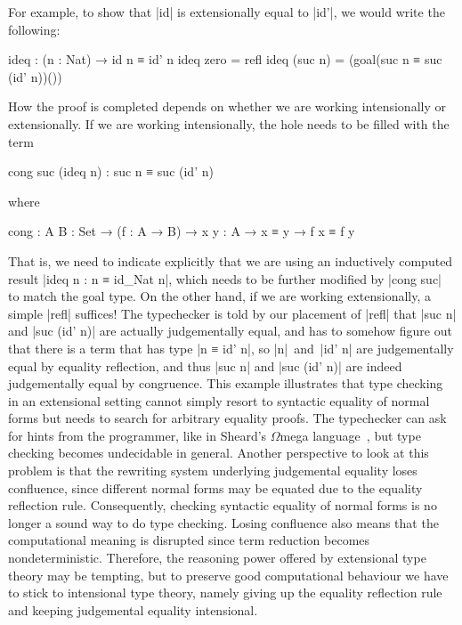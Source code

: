 For example, to show that |id| is extensionally equal to |id'|, we would write the following:
\begin{code}
ideq : (n : Nat) → id n ≡ id' n
ideq zero     = refl
ideq (suc n)  = (goal(suc n ≡ suc (id' n))())
\end{code}
How the proof is completed depends on whether we are working intensionally or extensionally. If we are working intensionally, the hole needs to be filled with the term
\begin{code}
cong suc (ideq n) : suc n ≡ suc (id' n)
\end{code}
where
\begin{code}
cong : {A B : Set} → (f : A → B) → {x y : A} → x ≡ y → f x ≡ f y
\end{code}
That is, we need to indicate explicitly that we are using an inductively computed result |ideq n : n ≡ id_Nat n|, which needs to be further modified by |cong suc| to match the goal type.
On the other hand, if we are working extensionally, a simple |refl| suffices!
The typechecker is told by our placement of |refl| that |suc n| and |suc (id' n)| are actually judgementally equal, and has to somehow figure out that there is a term that has type |n ≡ id' n|, so |n|~and~|id' n| are judgementally equal by equality reflection, and thus |suc n| and |suc (id' n)| are indeed judgementally equal by congruence.
This example illustrates that type checking in an extensional setting cannot simply resort to syntactic equality of normal forms but needs to search for arbitrary equality proofs. The typechecker can ask for hints from the programmer, like in Sheard's {$\Omega$}mega language~\citep{Sheard-Omega}, but type checking becomes undecidable in general.
Another perspective to look at this problem is that the rewriting system underlying judgemental equality loses confluence, since different normal forms may be equated due to the equality reflection rule.
Consequently, checking syntactic equality of normal forms is no longer a sound way to do type checking.
Losing confluence also means that the computational meaning is disrupted since term reduction becomes nondeterministic.
Therefore, the reasoning power offered by extensional type theory may be tempting, but to preserve good computational behaviour we have to stick to intensional type theory, namely giving up the equality reflection rule and keeping judgemental equality intensional.

